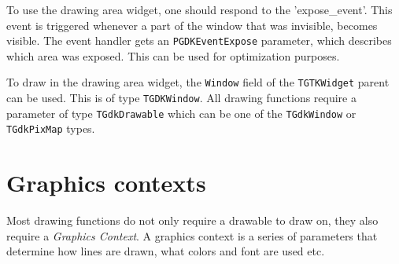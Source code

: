 \documentclass[10pt]{article}
\newcommand{\var}[1]{\texttt{#1}}
\begin{document}
To use the drawing area widget, one should respond to the 'expose\_event'.
This event is triggered whenever a part of the window that was invisible,
becomes visible. The event handler gets an \var{PGDKEventExpose} parameter,
which describes which area was exposed. This can be used for optimization
purposes.

To draw in the drawing area widget, the \var{Window} field of the
\var{TGTKWidget} parent can be used. This is of type \var{TGDKWindow}.
All drawing functions require a parameter of type \var{TGdkDrawable}
which can be one of the \var{TGdkWindow} or \var{TGdkPixMap} types.

\section{Graphics contexts}
Most drawing functions do not only require a drawable to draw on, they also
require a {\em Graphics Context}. A graphics context is a series of
parameters that determine how lines are drawn, what colors and font are
used etc.
\end{document}
